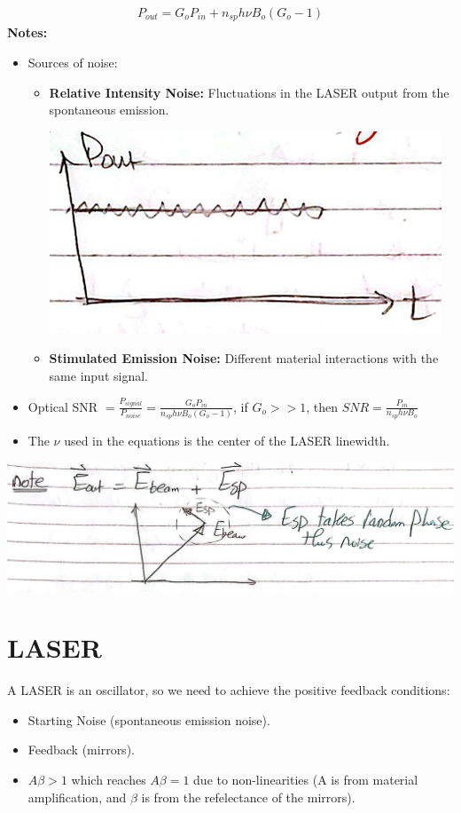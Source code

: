 \documentclass[11pt]{article}
\begin{document}
\begin{align*}
    P_{out} = G_o P_{in} + n_{sp} h \nu B_o (G_o - 1)
\end{align*}
\textbf{Notes:}
\begin{itemize}
    \item Sources of noise:
    \begin{itemize}
        \item \textbf{Relative Intensity Noise:} Fluctuations in the LASER output from the spontaneous emission.
        \begin{center}
            \includegraphics[scale=0.8]{5.png}
        \end{center}
        \item \textbf{Stimulated Emission Noise:} Different material interactions with the same input signal. 
    \end{itemize}
    \item Optical SNR $= \frac{P_{signal}}{P_{noise}} = \frac{G_o P_{in}}{n_{sp} h \nu B_o (G_o - 1)}$, if $G_o >> 1$, then $SNR = \frac{P_{in}}{n_{sp} h \nu B_o}$
    \item The $\nu$ used in the equations is the center of the LASER linewidth.
\end{itemize}
\begin{center}
    \includegraphics[scale=0.5]{6.png}
\end{center}

\section{LASER}
A LASER is an oscillator, so we need to achieve the positive feedback conditions:
\begin{itemize}
    \item Starting Noise (spontaneous emission noise).
    \item Feedback (mirrors).
    \item $A \beta > 1$ which reaches $A \beta = 1$ due to non-linearities (A is from material amplification, and $\beta$ is from the refelectance of the mirrors).
\end{itemize}
\end{document}
